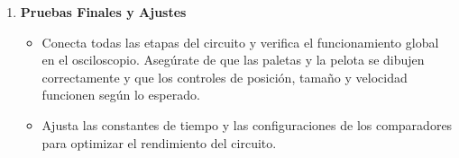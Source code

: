 \begin{enumerate}
\item \textbf{Pruebas Finales y Ajustes}
\begin{itemize}
\item Conecta todas las etapas del circuito y verifica el funcionamiento global en el osciloscopio. Asegúrate de que las paletas y la pelota se dibujen correctamente y que los controles de posición, tamaño y velocidad funcionen según lo esperado.
\item Ajusta las constantes de tiempo y las configuraciones de los comparadores para optimizar el rendimiento del circuito.
\end{itemize}
\end{enumerate}


